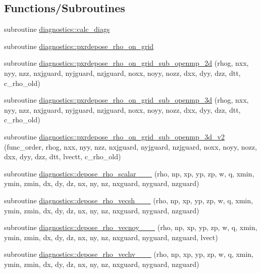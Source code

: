 \subsection*{Functions/\+Subroutines}
\begin{DoxyCompactItemize}
\item 
subroutine \hyperlink{namespacediagnostics_ae7171376e1d30d3465491f0f75a39180}{diagnostics\+::calc\+\_\+diags}
\item 
subroutine \hyperlink{namespacediagnostics_a8d8c31da5108571fdd3224cd692cf61a}{diagnostics\+::pxrdepose\+\_\+rho\+\_\+on\+\_\+grid}
\item 
subroutine \hyperlink{namespacediagnostics_a13a5047b07a130b8790d9240f55d5f50}{diagnostics\+::pxrdepose\+\_\+rho\+\_\+on\+\_\+grid\+\_\+sub\+\_\+openmp\+\_\+2d} (rhog, nxx, nyy, nzz, nxjguard, nyjguard, nzjguard, noxx, noyy, nozz, dxx, dyy, dzz, dtt, c\+\_\+rho\+\_\+old)
\item 
subroutine \hyperlink{namespacediagnostics_a71e49f591ad529271f68450170310c6a}{diagnostics\+::pxrdepose\+\_\+rho\+\_\+on\+\_\+grid\+\_\+sub\+\_\+openmp\+\_\+3d} (rhog, nxx, nyy, nzz, nxjguard, nyjguard, nzjguard, noxx, noyy, nozz, dxx, dyy, dzz, dtt, c\+\_\+rho\+\_\+old)
\item 
subroutine \hyperlink{namespacediagnostics_ab9048ee1e174ef107883875a0f750305}{diagnostics\+::pxrdepose\+\_\+rho\+\_\+on\+\_\+grid\+\_\+sub\+\_\+openmp\+\_\+3d\+\_\+v2} (func\+\_\+order, rhog, nxx, nyy, nzz, nxjguard, nyjguard, nzjguard, noxx, noyy, nozz, dxx, dyy, dzz, dtt, lvectt, c\+\_\+rho\+\_\+old)
\item 
subroutine \hyperlink{namespacediagnostics_a8c121f68d09e968d4a5c74811759b0f5}{diagnostics\+::depose\+\_\+rho\+\_\+scalar\+\_\+\_\+\_} (rho, np, xp, yp, zp, w, q, xmin, ymin, zmin, dx, dy, dz, nx, ny, nz, nxguard, nyguard, nzguard)
\item 
subroutine \hyperlink{namespacediagnostics_af2af5ba421e1e51c0bf4851aa5f4f387}{diagnostics\+::depose\+\_\+rho\+\_\+vecsh\+\_\+\_\+\_} (rho, np, xp, yp, zp, w, q, xmin, ymin, zmin, dx, dy, dz, nx, ny, nz, nxguard, nyguard, nzguard)
\item 
subroutine \hyperlink{namespacediagnostics_a5c6c3ca3305fe114983561316d733fc6}{diagnostics\+::depose\+\_\+rho\+\_\+vecnoy\+\_\+\_\+\_} (rho, np, xp, yp, zp, w, q, xmin, ymin, zmin, dx, dy, dz, nx, ny, nz, nxguard, nyguard, nzguard, lvect)
\item 
subroutine \hyperlink{namespacediagnostics_aa80c907f0f5c0becf0810c995f00a21a}{diagnostics\+::depose\+\_\+rho\+\_\+vechv\+\_\+\_\+\_} (rho, np, xp, yp, zp, w, q, xmin, ymin, zmin, dx, dy, dz, nx, ny, nz, nxguard, nyguard, nzguard)

\end{DoxyCompactItemize}
